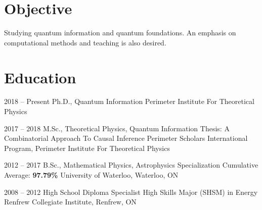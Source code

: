 \documentclass{article}
\begin{document}

    \section{Objective}
    Studying quantum information and quantum foundations. An emphasis on computational methods and teaching is also desired.
    \section{Education}
    \begin{educationlist}
        \item{2018 -- Present}
            {Ph.D., Quantum Information}
            {}
            {Perimeter Institute For Theoretical Physics}
        \item{2017 -- 2018}
            {M.Sc., Theoretical Physics, Quantum Information}
            {Thesis: A Combinatorial Approach To Causal Inference}
            {Perimeter Scholars International Program, Perimeter Institute For Theoretical Physics}
        \item{2012 -- 2017}
            {B.Sc., Mathematical Physics, Astrophysics Specialization}
            {Cumulative Average: \textbf{97.79\%}}
            {University of Waterloo, Waterloo, ON}
        \item{2008 -- 2012}
            {High School Diploma}
            {Specialist High Skills Major (SHSM) in Energy}
            {Renfrew Collegiate Institute, Renfrew, ON}
    \end{educationlist}
\end{document}

